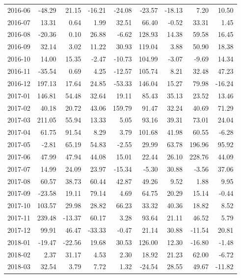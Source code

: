 \begin{table}[ht]
\begin{tabular}{lrrrrrrrr}
  2016-06 & -48.29 & 21.15 & -16.21 & -24.08 & -23.57 & -18.13 & 7.20 & 10.50 \\ 
  2016-07 & 13.31 & 0.64 & 1.99 & 32.51 & 66.40 & -0.52 & 33.31 & 1.45 \\ 
  2016-08 & -20.36 & 0.10 & 26.88 & -6.62 & 128.93 & 14.38 & 59.58 & 16.45 \\ 
  2016-09 & 32.14 & 3.02 & 11.22 & 30.93 & 119.04 & 3.88 & 50.90 & 18.38 \\ 
  2016-10 & 14.00 & 15.35 & -2.47 & -10.73 & 104.99 & -3.07 & -9.69 & 14.34 \\ 
  2016-11 & -35.54 & 0.69 & 4.25 & -12.57 & 105.74 & 8.21 & 32.48 & 47.23 \\ 
  2016-12 & 197.13 & 17.64 & 24.85 & -53.33 & 146.04 & 15.27 & 79.98 & -16.24 \\ 
  2017-01 & 146.81 & 54.48 & 32.64 & 19.11 & 85.43 & 35.13 & 23.52 & 13.46 \\ 
  2017-02 & 40.18 & 20.72 & 43.06 & 159.79 & 91.47 & 32.24 & 40.69 & 71.29 \\ 
  2017-03 & 211.05 & 55.94 & 13.33 & 5.05 & 93.16 & 39.31 & 73.01 & 24.04 \\ 
  2017-04 & 61.75 & 91.54 & 8.29 & 3.79 & 101.68 & 41.98 & 60.55 & -6.28 \\ 
  2017-05 & -2.81 & 65.19 & 54.83 & -2.55 & 29.99 & 63.78 & 196.96 & 95.92 \\ 
  2017-06 & 47.99 & 47.94 & 44.08 & 15.01 & 22.44 & 26.10 & 228.76 & 44.09 \\ 
  2017-07 & 14.99 & 24.09 & 23.97 & -15.34 & -5.30 & 30.88 & -3.56 & 37.06 \\ 
  2017-08 & 60.57 & 38.73 & 60.44 & 42.87 & 49.26 & 9.52 & 1.88 & 9.95 \\ 
  2017-09 & -23.58 & 19.11 & 79.14 & 4.69 & 64.75 & 20.29 & 15.14 & -0.44 \\ 
  2017-10 & 103.57 & 29.98 & 28.82 & 66.23 & 33.32 & 40.36 & 18.82 & 8.52 \\ 
  2017-11 & 239.48 & -13.37 & 60.17 & 3.28 & 93.64 & 21.11 & 46.52 & 5.79 \\ 
  2017-12 & 99.91 & 46.47 & -33.33 & -0.47 & 21.14 & 30.88 & -11.54 & 20.81 \\ 
  2018-01 & -19.47 & -22.56 & 19.68 & 30.53 & 126.00 & 12.30 & -16.80 & -1.48 \\ 
  2018-02 & 2.37 & 31.17 & 4.53 & 2.30 & 18.92 & 21.23 & 62.00 & -6.72 \\ 
  2018-03 & 32.54 & 3.79 & 7.72 & 1.32 & -24.54 & 28.55 & 49.67 & -11.82 \\ 

\end{tabular}
\end{table}
